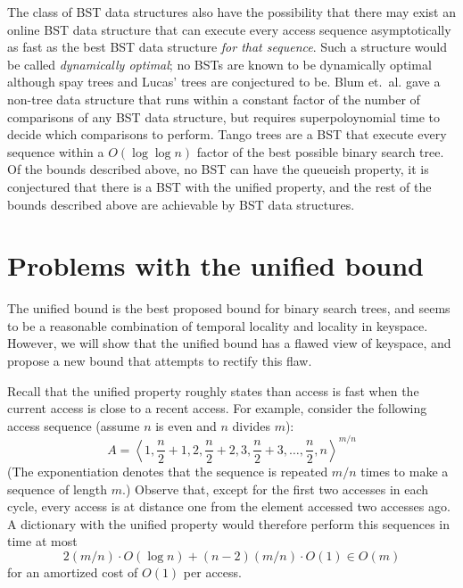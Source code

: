 \documentclass{llncs}
\newcommand{\BigOh}[1]{O\!\left(#1\right)}
\begin{document}
The class of BST data structures also have the possibility that there may exist an online BST data structure that can execute every access sequence asymptotically as fast as the best BST data structure \emph{for that sequence}. Such a structure would be called \emph{dynamically optimal}; no BSTs are known to be dynamically optimal although spay trees and Lucas' trees \cite{lucas} are conjectured to be. Blum et.~al. \cite{blum} gave a non-tree data structure that runs within a constant factor of the number of comparisons of any BST data structure, but requires superpoloynomial time to decide which comparisons to perform. Tango trees \cite{DBLP:journals/siamcomp/DemaineHIP07} are a BST that execute every sequence within a $\BigOh{\log \log n}$ factor of the best possible binary search tree. Of the bounds described above, no BST can have the queueish property, it is conjectured that there is a BST with the unified property, and the rest of the bounds described above are achievable by BST data structures.

\section{Problems with the unified bound}

The unified bound is the best proposed bound for binary search trees, and seems to be a reasonable combination of temporal locality and locality in keyspace. However, we will show that the unified bound has a flawed view of keyspace, and propose a new bound that attempts to rectify this flaw.

Recall that the unified property roughly states than access is fast when the current access is close to a recent access. For example, consider the following access sequence (assume $n$ is even and $n$ divides $m$): %
\begin{equation}
	A = \left\langle 1, \frac{n}{2}+1, 2, \frac{n}{2}+2, 3, \frac{n}{2}+3, \ldots, \frac{n}{2}, n \right\rangle^{m/n} \label{eq:bear}
\end{equation}
(The exponentiation denotes that the sequence is repeated $m/n$ times
to make a sequence of length $m$.)
Observe that, except for the first two accesses in each cycle, every access is at distance one from the element accessed two accesses ago.  A dictionary with the unified
property would therefore perform this sequences in time at most
\[
   2(m/n)\cdot \BigOh{\log n} + (n-2)(m/n)\cdot \BigOh{1} \in \BigOh{m}
\]
for an amortized cost of $\BigOh{1}$ per access.  
\end{document}
